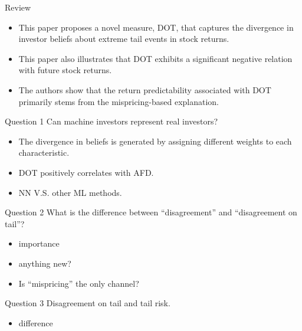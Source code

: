 \documentclass[UTF8, 16pt]{beamer}
\begin{document}
\begin{CJK*}{UTF8}{gbsn}
\begin{frame}{Review}
	\begin{itemize}
		\item This paper proposes a novel measure, DOT, that captures the divergence in investor beliefs about extreme tail events in stock returns.
		\item This paper also illustrates that DOT exhibits a significant negative relation with future stock returns.
		\item The authors show that the return predictability associated with DOT primarily stems from the mispricing-based explanation.
	\end{itemize}
\end{frame}
\begin{frame}{Question 1}
	Can machine investors represent real investors?
	\begin{itemize}
		\item The divergence in beliefs is generated by assigning different weights to each characteristic.
		\item DOT positively correlates with AFD.
		\item NN V.S. other ML methods.
	\end{itemize}
\end{frame}
\begin{frame}{Question 2}
	What is the difference between ``disagreement'' and ``disagreement on tail''?
	\begin{itemize}
		\item importance
		\item anything new?
		\item Is ``mispricing'' the only channel?
	\end{itemize}
\end{frame}
\begin{frame}{Question 3}
	 Disagreement on tail and tail risk.
	 \begin{itemize}
	 	\item difference
	 \end{itemize}
\end{frame}





\end{CJK*}
\end{document}
